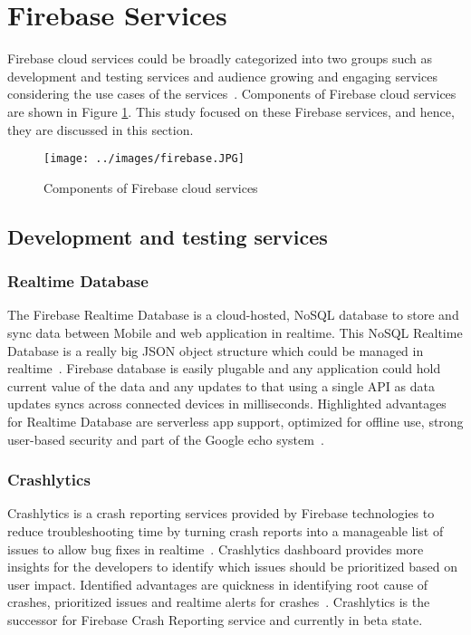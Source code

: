 \section{Firebase Services}

Firebase cloud services could be broadly categorized into two groups such as
development and testing services and audience growing and engaging services
considering the use cases of the
services~\cite{hid-sp18-409-www-firebase-products}. Components of Firebase cloud
services are shown in Figure \ref{fig:firebase}. This study focused on these
Firebase services, and hence, they are discussed in this section.

\begin{figure}[htb]
	\centering\texttt{[image: ../images/firebase.JPG]}
	\caption{ Components of Firebase cloud services 
		\cite{hid-sp18-409-www-firebase}}
	\label{fig:firebase}
\end{figure}

\subsection{Development and testing services}

\subsubsection{Realtime Database} The Firebase Realtime Database is a
cloud-hosted, NoSQL database to store and sync data between Mobile and web
application in realtime. This NoSQL Realtime Database is a really big JSON
object structure which could be managed in
realtime~\cite{hid-sp18-409-www-firebase-wikipedia,
	hid-sp18-409-www-firebase-products}. Firebase database is easily plugable 
	and
any application could hold current value of the data and any updates to that
using a single API as data updates syncs across connected devices in
milliseconds. Highlighted advantages for Realtime Database are serverless app
support, optimized for offline use, strong user-based security and part of the
Google echo system~\cite{hid-sp18-409-www-firebase-products}.

\subsubsection{Crashlytics} Crashlytics is a crash reporting services provided
by Firebase technologies to reduce troubleshooting time by turning crash reports
into a manageable list of issues to allow bug fixes in
realtime~\cite{hid-sp18-409-www-firebase-products}. Crashlytics dashboard
provides more insights for the developers to identify which issues should be
prioritized based on user impact. Identified advantages are quickness in
identifying root cause of crashes, prioritized issues and realtime alerts for
crashes~\cite{hid-sp18-409-www-firebase-products}. Crashlytics is the successor
for Firebase Crash Reporting service and currently in beta state.

